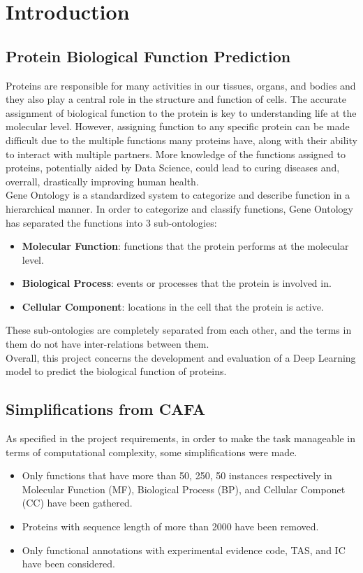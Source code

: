 \documentclass[10pt,twocolumn,letterpaper]{article}
\begin{document}
\section{Introduction}

\subsection{Protein Biological Function Prediction}
Proteins are responsible for many activities in our tissues, organs, and bodies and they also play a central role in the structure and function of cells.
The accurate assignment of biological function to the protein is key to understanding life at the molecular level. However, assigning function to any 
specific protein can be made difficult due to the multiple functions many proteins have, along with their ability 
to interact with multiple partners. More knowledge of the functions assigned to proteins, potentially aided by Data Science, could 
lead to curing diseases and, overrall, drastically improving human health.\\

Gene Ontology is a standardized system to categorize and describe function in a hierarchical manner.
In order to categorize and classify functions, Gene Ontology has separated the functions into 3 sub-ontologies:
\begin{itemize}
\item {\bf Molecular Function}: functions that the protein performs at the molecular level.
\item {\bf Biological Process}: events or processes that the protein is involved in.
\item {\bf Cellular Component}: locations in the cell that the protein is active. 
\end{itemize}
These sub-ontologies are completely separated from each other, and the terms in them do not have inter-relations between them. \\


Overall, this project concerns the development and evaluation of a Deep Learning model to predict the biological function of proteins.



\subsection{Simplifications from CAFA}
As specified in the project requirements, in order to make the task manageable in terms of computational complexity, some simplifications were made.
\begin{itemize}
\item Only functions that have more than 50, 250, 50 instances respectively in Molecular Function (MF), Biological Process (BP), and Cellular Componet (CC) have been gathered. 
\item Proteins with sequence length of more than 2000 have been removed.
\item Only functional annotations with experimental evidence code, TAS, and IC have been considered.
\end{itemize}
\end{document}
